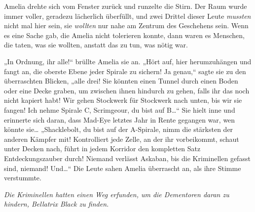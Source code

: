 Amelia drehte sich vom Fenster zurück und runzelte die Stirn. Der Raum wurde immer voller, geradezu lächerlich überfüllt, und zwei Drittel dieser Leute \emph{mussten} nicht mal hier sein, sie \emph{wollten} nur nahe am Zentrum des Geschehens sein. Wenn es eine Sache gab, die Amelia nicht tolerieren konnte, dann waren es Menschen, die taten, was sie wollten, anstatt das zu tun, was nötig war.

„In Ordnung, ihr alle!“ brüllte Amelia sie an. „Hört auf, hier herumzuhängen und fangt an, die oberste Ebene jeder Spirale zu sichern! Ja genau,“ sagte sie zu den überraschten Blicken, „alle drei! Sie könnten einen Tunnel durch einen Boden oder eine Decke graben, um zwischen ihnen hindurch zu gehen, falls ihr das noch nicht kapiert habt! Wir gehen Stockwerk für Stockwerk nach unten, bis wir sie fangen! Ich nehme Spirale C, Scrimgeour, du bist auf B…“ Sie hielt inne und erinnerte sich daran, dass Mad-Eye letztes Jahr in Rente gegangen war, wen könnte sie… „Shacklebolt, du bist auf der A-Spirale, nimm die stärksten der anderen Kämpfer mit! Kontrolliert jede Zelle, an der ihr vorbeikommt, schaut unter Decken nach, führt in jedem Korridor den kompletten Satz Entdeckungszauber durch! Niemand verlässt Askaban, bis die Kriminellen gefasst sind, niemand! Und…“ Die Leute sahen Amelia überrascht an, als ihre Stimme verstummte.

\emph{Die Kriminellen hatten einen Weg erfunden, um die Dementoren daran zu hindern, Bellatrix Black zu finden.}

